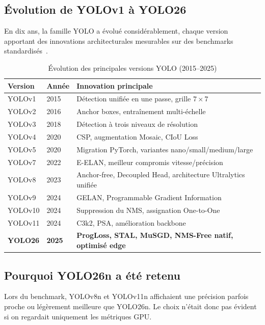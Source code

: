 \subsection{Évolution de YOLOv1 à YOLO26}

En dix ans, la famille YOLO a évolué
considérablement, chaque version apportant
des innovations architecturales mesurables
sur des benchmarks standardisés~\cite{ramos2025}.

\begin{table}[H]
\centering
\caption{Évolution des principales versions
         YOLO (2015--2025)}
\begin{tabularx}{\textwidth}{llX}
\toprule
\textbf{Version} &
\textbf{Année} &
\textbf{Innovation principale} \\
\midrule
YOLOv1 & 2015 &
Détection unifiée en une passe,
grille $7\times7$ \\
YOLOv2 & 2016 &
Anchor boxes, entraînement multi-échelle \\
YOLOv3 & 2018 &
Détection à trois niveaux de résolution \\
YOLOv4 & 2020 &
CSP, augmentation Mosaic, CIoU Loss \\
YOLOv5 & 2020 &
Migration PyTorch, variantes
nano/small/medium/large \\
YOLOv7 & 2022 &
E-ELAN, meilleur compromis
vitesse/précision \\
YOLOv8 & 2023 &
Anchor-free, Decoupled Head,
architecture Ultralytics unifiée \\
YOLOv9 & 2024 &
GELAN, Programmable Gradient
Information \\
YOLOv10 & 2024 &
Suppression du NMS, assignation
One-to-One \\
YOLOv11 & 2024 &
C3k2, PSA, amélioration backbone \\
\rowcolor{PrimaryBlue!15}
\textbf{YOLO26} & \textbf{2025} &
\textbf{ProgLoss, STAL, MuSGD,
NMS-Free natif, optimisé edge} \\
\bottomrule
\end{tabularx}
\label{tab:yolo_evolution}
\end{table}

\subsection{Pourquoi YOLO26n a été retenu}

Lors du benchmark, YOLOv8n et YOLOv11n
affichaient une précision parfois proche
ou légèrement meilleure que YOLO26n. Le
choix n'était donc pas évident si on
regardait uniquement les métriques GPU.

